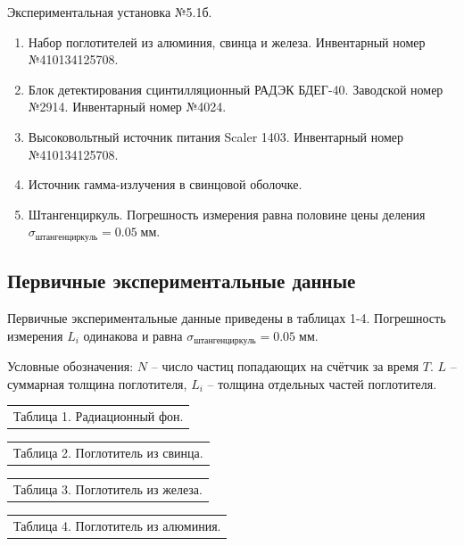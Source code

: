 \documentclass[10pt,a4paper]{article}
\newcommand{\mm}{\; мм}
\begin{document}
	Экспериментальная установка №5.1б.
	
	\begin{enumerate}
		\item Набор поглотителей из алюминия, свинца и железа. Инвентарный номер №410134125708.
		
		\item Блок детектирования сцинтилляционный РАДЭК БДЕГ-40. Заводской номер №2914. Инвентарный номер №4024.
		
		\item Высоковольтный источник питания Scaler 1403. Инвентарный номер №410134125708.
		
		\item Источник гамма-излучения в свинцовой оболочке.
		
		\item Штангенциркуль. Погрешность измерения равна половине цены деления $\sigma_{штангенциркуль} = 0.05 \mm$.
	\end{enumerate}
	
	\subsection*{Первичные экспериментальные данные}
	
	Первичные экспериментальные данные приведены в таблицах 1-4. Погрешность измерения $L_i$ одинакова и равна $\sigma_{штангенциркуль} = 0.05 \mm$.
	
	Условные обозначения: $N$ -- число частиц попадающих на счётчик за время $T$. $L$ -- суммарная толщина поглотителя, $L_i$ -- толщина отдельных частей поглотителя.
	
	\begin{multicols}{2}
		\begin{tabular}[t]{l}
			Таблица 1. Радиационный фон. \\
			
		\end{tabular}
		
		\begin{tabular}[t]{l}
			Таблица 2. Поглотитель из свинца. \\
			
		\end{tabular} 
	\end{multicols}
	
	\begin{multicols}{2}
		\begin{tabular}[t]{l}
			Таблица 3. Поглотитель из железа. \\
			
		\end{tabular}
		
		\begin{tabular}[t]{l}
			Таблица 4. Поглотитель из алюминия. \\
			
		\end{tabular}
	\end{multicols}
	
\end{document}
